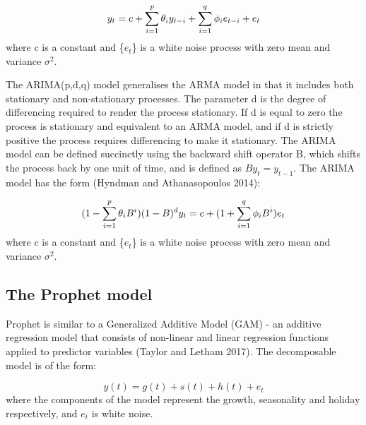 \documentclass[12pt,a4paper]{article}
\numberwithin{equation}{section}
\numberwithin{figure}{section}
\numberwithin{table}{section}
\begin{document}
\[ 
    y_t = c + \sum_{i = 1}^{p} \theta_{i} y_{t-i} + \sum_{i = 1}^{q} \phi_{i} e_{t-i}+ e_t \label{eq1} \\ \notag
\] where c is a constant and \{\(e_t\)\} is a white noise process with
zero mean and variance \(\sigma^2\).

The ARIMA(p,d,q) model generalises the ARMA model in that it includes
both stationary and non-stationary processes. The parameter d is the
degree of differencing required to render the process stationary. If d
is equal to zero the process is stationary and equivalent to an ARMA
model, and if d is strictly positive the process requires differencing
to make it stationary. The ARIMA model can be defined succinctly using
the backward shift operator B, which shifts the process back by one unit
of time, and is defined as \(By_t = y_{t-1}\). The ARIMA model has the
form (Hyndman and Athanasopoulos 2014):

\[ 
    (1-\sum_{i = 1}^{p} \theta_{i} B^i)(1-B)^dy_t = c + (1 + \sum_{i = 1}^{q} \phi_{i} B^i)e_t \label{eq2} \\ \notag 
\] where c is a constant and \{\(e_t\)\} is a white noise process with
zero mean and variance \(\sigma^2\).

\subsection{The Prophet model}\label{the-prophet-model}

Prophet is similar to a Generalized Additive Model (GAM) - an additive
regression model that consists of non-linear and linear regression
functions applied to predictor variables (Taylor and Letham 2017). The
decomposable model is of the form:

\[ 
    y(t) = g(t) + s(t) + h(t) + e_t
\] where the components of the model represent the growth, seasonality
and holiday respectively, and \(e_t\) is white noise.
\end{document}
